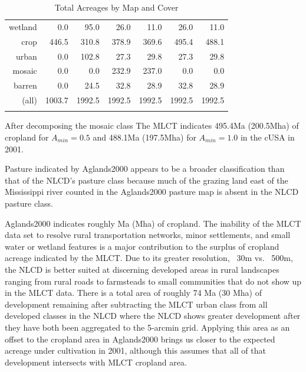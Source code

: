 \begin{Schunk}
\begin{table}[ht]
\begin{center}
{\begin{tabular}{rrrrrrr}
  wetland & 0.0 & 95.0 & 26.0 & 11.0 & 26.0 & 11.0 \\ 
  crop & 446.5 & 310.8 & 378.9 & 369.6 & 495.4 & 488.1 \\ 
  urban & 0.0 & 102.8 & 27.3 & 29.8 & 27.3 & 29.8 \\ 
  mosaic & 0.0 & 0.0 & 232.9 & 237.0 & 0.0 & 0.0 \\ 
  barren & 0.0 & 24.5 & 32.8 & 28.9 & 32.8 & 28.9 \\ 
  (all) & 1003.7 & 1992.5 & 1992.5 & 1992.5 & 1992.5 & 1992.5 \\ 
   \noalign{\smallskip} \hline
\end{tabular}
}
\caption{Total Acreages by Map and Cover}
\label{tab:areas}
\end{center}
\end{table}\begin{Sinput}
 
 
 
\end{Sinput}
\end{Schunk}


After decomposing the mosaic class The MLCT indicates
495.4Ma (200.5Mha) of cropland for
$A_{min}=0.5$ and 488.1Ma (197.5Mha) for
$A_{min}=1.0$ in the cUSA in 2001. 

Pasture indicated by Aglands2000 appears to be a broader
classification than that of the NLCD's pasture class because much of
the grazing land east of the Mississippi river counted in the
Aglands2000 pasture map is absent in the NLCD pasture class.

Aglands2000 indicates roughly
Ma (Mha) of cropland.  The
inability of the MLCT data set to resolve rural transportation
networks, minor settlements, and small water or wetland features is a
major contribution to the surplus of cropland acreage indicated by the
MLCT.  Due to its greater resolution, ~30m vs. ~500m, the NLCD is
better suited at discerning developed areas in rural landscapes
ranging from rural roads to farmsteads to small communities that do
not show up in the MLCT data. There is a total area of roughly 74 Ma
(30 Mha) of development remaining after subtracting the MLCT urban
class from all developed classes in the NLCD where the NLCD shows
greater development after they have both been aggregated to the
5-arcmin grid. Applying this area as an offset to the cropland area in
Aglands2000 brings us closer to the expected acreage under cultivation
in 2001, although this assumes that all of that development intersects
with MLCT cropland area.


